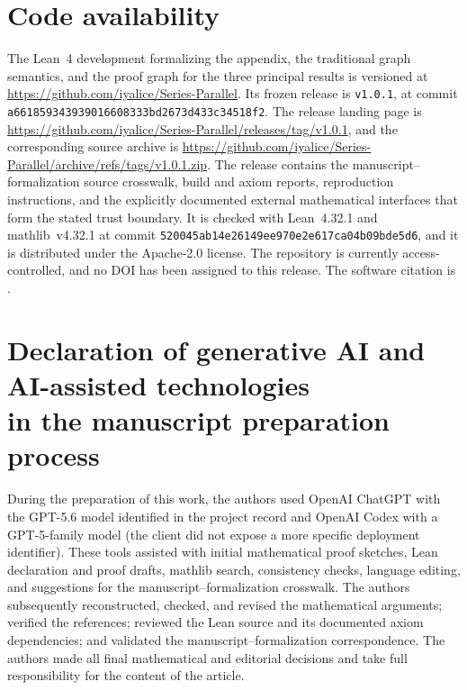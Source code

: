 \documentclass[a4paper,fleqn]{cas-sc}
\newif\ifshowrevisions
\newenvironment{revision}{\begingroup\ifshowrevisions\color{blue}\fi}{\endgroup}
\numberwithin{equation}{section}
\theoremstyle{plain}
\theoremstyle{definition}
\begin{document}
\section*{Code availability}
\begin{revision}
The Lean~4 development formalizing the appendix, the traditional graph
semantics, and the proof graph for the three principal results is versioned at
\url{https://github.com/iyalice/Series-Parallel}.  Its frozen release is
\texttt{v1.0.1}, at commit
\texttt{a661859343939016608333bd2673d433c34518f2}.  The release landing page is
\url{https://github.com/iyalice/Series-Parallel/releases/tag/v1.0.1}, and the
corresponding source archive is
\url{https://github.com/iyalice/Series-Parallel/archive/refs/tags/v1.0.1.zip}.
The release contains the manuscript--formalization source crosswalk, build and
axiom reports, reproduction instructions, and the explicitly documented
external mathematical interfaces that form the stated trust boundary.  It is
checked with Lean~4.32.1 and mathlib~v4.32.1 at commit
\texttt{520045ab14e26149ee970e2e617ca04b09bde5d6}, and it is distributed under
the Apache-2.0 license.  The repository is currently access-controlled, and no
DOI has been assigned to this release.  The software citation is
\cite{DingHeLiangZheng2026Software}.
\end{revision}

\section*{Declaration of generative AI and AI-assisted technologies\\
in the manuscript preparation process}
\begin{revision}
During the preparation of this work, the authors used OpenAI ChatGPT with the
GPT-5.6 model identified in the project record and OpenAI Codex with a
GPT-5-family model (the client did not expose a more specific deployment
identifier).  These tools assisted with initial mathematical proof sketches,
Lean declaration and proof drafts, mathlib search, consistency checks,
language editing, and suggestions for the manuscript--formalization
crosswalk.  The authors subsequently reconstructed, checked, and revised the
mathematical arguments; verified the references; reviewed the Lean source and
its documented axiom dependencies; and validated the manuscript--formalization
correspondence.  The authors made all final mathematical and editorial
decisions and take full responsibility for the content of the article.
\end{revision}
\end{document}
